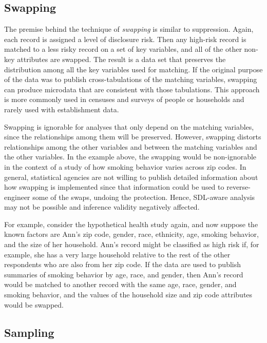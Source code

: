 \hypertarget{swapping}{%
\subsection{Swapping}\label{swapping}}

The premise behind the technique of \emph{swapping} is similar to suppression. Again, each record is assigned a level of disclosure risk. Then any high-risk record is matched to a less risky record on a set of key variables, and all of the other non-key attributes are swapped. The result is a data set that preserves the distribution among all the key variables used for matching. If the original purpose of the data was to publish cross-tabulations of the matching variables, swapping can produce microdata that are consistent with those tabulations. This approach is more commonly used in censuses and surveys of people or households and rarely used with establishment data.

Swapping is ignorable for analyses that only depend on the matching variables, since the relationships among them will be preserved. However, swapping distorts relationships among the other variables and between the matching variables and the other variables. In the example above, the swapping would be non-ignorable in the context of a study of how smoking behavior varies across zip codes. In general, statistical agencies are not willing to publish detailed information about how swapping is implemented since that information could be used to reverse-engineer some of the swaps, undoing the protection. Hence, SDL-aware analysis may not be possible and inference validity negatively affected.


\begin{bboxfix}
For example, consider the hypothetical health study again, and now
suppose the known factors are Ann's zip code, gender, race, ethnicity,
age, smoking behavior, and the size of her household. Ann's record might
be classified as high risk if, for example, she has a very large
household relative to the rest of the other respondents who are also
from her zip code. If the data are used to publish summaries of smoking
behavior by age, race, and gender, then Ann's record would be matched to
another record with the same age, race, gender, and smoking behavior,
and the values of the household size and zip code attributes would be
swapped.
\end{bboxfix}


\hypertarget{sampling}{%
\subsection{Sampling}\label{sampling}}

